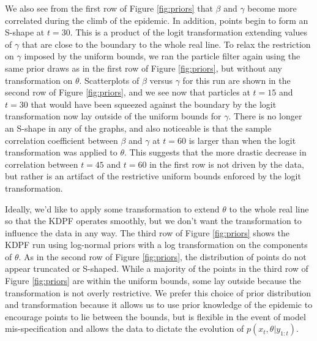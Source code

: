 \documentclass{elsarticle}
\begin{document}
We also see from the first row of Figure \ref{fig:priors} that $\beta$ and $\gamma$ become more correlated during the climb of the epidemic. In addition, points begin to form an S-shape at $t = 30$. This is a product of the logit transformation extending values of $\gamma$ that are close to the boundary to the whole real line. To relax the restriction on $\gamma$ imposed by the uniform bounds, we ran the particle filter again using the same prior draws as in the first row of Figure \ref{fig:priors}, but without any transformation on $\theta$. Scatterplots of $\beta$ versus $\gamma$ for this run are shown in the second row of Figure \ref{fig:priors}, and we see now that particles at $t = 15$ and $t = 30$ that would have been squeezed against the boundary by the logit transformation now lay outside of the uniform bounds for $\gamma$. There is no longer an S-shape in any of the graphs, and also noticeable is that the sample correlation coefficient between $\beta$ and $\gamma$ at $t = 60$ is larger than when the logit transformation was applied to $\theta$. This suggests that the more drastic decrease in correlation between $t = 45$ and $t = 60$ in the first row is not driven by the data, but rather is an artifact of the restrictive uniform bounds enforced by the logit transformation.

Ideally, we'd like to apply some transformation to extend $\theta$ to the whole real line so that the KDPF operates smoothly, but we don't want the transformation to influence the data in any way. The third row of Figure \ref{fig:priors} shows the KDPF run using log-normal priors with a log transformation on the components of $\theta$. As in the second row of Figure \ref{fig:priors}, the distribution of points do not appear truncated or S-shaped. While a majority of the points in the third row of Figure \ref{fig:priors} are within the uniform bounds, some lay outside because the transformation is not overly restrictive. We prefer this choice of prior distribution and transformation because it allows us to use prior knowledge of the epidemic to encourage points to lie between the bounds, but is flexible in the event of model mis-specification and allows the data to dictate the evolution of $p(x_t,\theta|y_{1:t})$.
\end{document}
